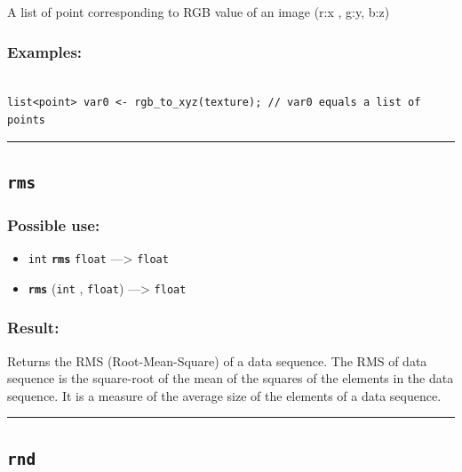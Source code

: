 \documentclass[]{book}
\providecommand{\tightlist}{%
  \setlength{\itemsep}{0pt}\setlength{\parskip}{0pt}}
\theoremstyle{definition}
\theoremstyle{definition}
\theoremstyle{definition}
\theoremstyle{remark}
\begin{document}
A list of point corresponding to RGB value of an image (r:x , g:y, b:z)

\subsubsection{Examples:}\label{examples-301}

\begin{verbatim}
 
list<point> var0 <- rgb_to_xyz(texture); // var0 equals a list of points
\end{verbatim}

\begin{center}\rule{0.5\linewidth}{\linethickness}\end{center}

\subsection{\texorpdfstring{\texttt{rms}}{rms}}\label{rms}

\subsubsection{Possible use:}\label{possible-use-440}

\begin{itemize}
\tightlist
\item
  \texttt{int} \textbf{\texttt{rms}} \texttt{float} ---\textgreater{}
  \texttt{float}
\item
  \textbf{\texttt{rms}} (\texttt{int} , \texttt{float})
  ---\textgreater{} \texttt{float}
\end{itemize}

\subsubsection{Result:}\label{result-426}

Returns the RMS (Root-Mean-Square) of a data sequence. The RMS of data
sequence is the square-root of the mean of the squares of the elements
in the data sequence. It is a measure of the average size of the
elements of a data sequence.

\begin{center}\rule{0.5\linewidth}{\linethickness}\end{center}

\subsection{\texorpdfstring{\texttt{rnd}}{rnd}}\label{rnd}
\end{document}
